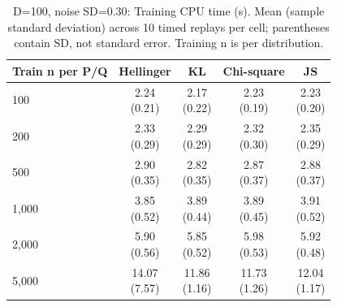 \begin{table}[t]
\centering
\small
\setlength{\tabcolsep}{4pt}
\caption{D=100, noise SD=0.30: Training CPU time (s). Mean (sample standard deviation) across 10 timed replays per cell; parentheses contain SD, not standard error. Training n is per distribution.}
\label{tab:sim-d-100-noise-sd-0-30-training-cpu-time-s}
\begin{tabular}{lcccc}
\toprule
Train n per P/Q & Hellinger & KL & Chi-square & JS \\
\midrule
100 & \shortstack{2.24\\(0.21)} & \shortstack{2.17\\(0.22)} & \shortstack{2.23\\(0.19)} & \shortstack{2.23\\(0.20)} \\
200 & \shortstack{2.33\\(0.29)} & \shortstack{2.29\\(0.29)} & \shortstack{2.32\\(0.30)} & \shortstack{2.35\\(0.29)} \\
500 & \shortstack{2.90\\(0.35)} & \shortstack{2.82\\(0.35)} & \shortstack{2.87\\(0.37)} & \shortstack{2.88\\(0.37)} \\
1,000 & \shortstack{3.85\\(0.52)} & \shortstack{3.89\\(0.44)} & \shortstack{3.89\\(0.45)} & \shortstack{3.91\\(0.52)} \\
2,000 & \shortstack{5.90\\(0.56)} & \shortstack{5.85\\(0.52)} & \shortstack{5.98\\(0.53)} & \shortstack{5.92\\(0.48)} \\
5,000 & \shortstack{14.07\\(7.57)} & \shortstack{11.86\\(1.16)} & \shortstack{11.73\\(1.26)} & \shortstack{12.04\\(1.17)} \\
\bottomrule
\end{tabular}
\end{table}

